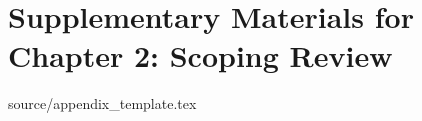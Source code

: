 \chapter{Supplementary Materials for Chapter 2: Scoping Review}
\label{app:scoping-review}

{source/appendix_template.tex}
